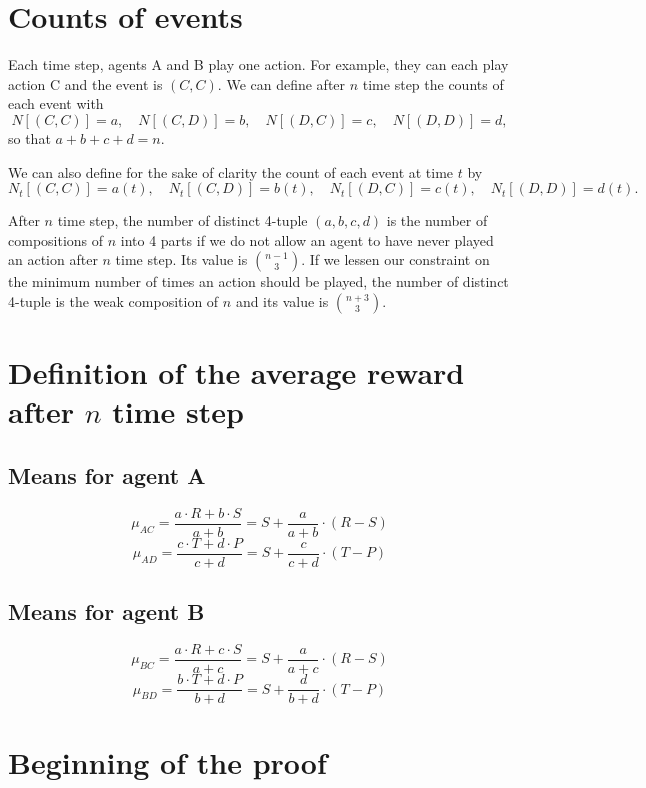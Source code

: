\documentclass{article}
\theoremstyle{definition}
\begin{document}

\section{Counts of events}

Each time step, agents A and B play one action. For example, they can each play action C and the event is \((C,C)\).  
We can define after \(n\) time step the counts of each event with 
\[
N[(C,C)] = a,\quad N[(C,D)] = b,\quad N[(D,C)] = c,\quad N[(D,D)] = d,
\]
so that \(a+b+c+d = n\).

We can also define for the sake of clarity the count of each event at time \(t\) by
\[
N_{t}[(C,C)] = a(t),\quad N_{t}[(C,D)] = b(t),\quad N_{t}[(D,C)] = c(t),\quad N_{t}[(D,D)] = d(t).
\]

After \(n\) time step, the number of distinct 4-tuple \((a,b,c,d)\) is the number of compositions of \(n\) into 4 parts if we do not allow an agent to have never played an action after \(n\) time step. Its value is \(\binom{n-1}{3}\). If we lessen our constraint on the minimum number of times an action should be played, the number of distinct 4-tuple is the weak composition of \(n\) and its value is \(\binom{n+3}{3}\). 

\section{Definition of the average reward after \(n\) time step}

\subsection{Means for agent A}

\[
\mu_{AC} = \frac{a \cdot R + b \cdot S}{a+b} = S+\frac{a}{a+b} \cdot (R-S)
\]
\[
\mu_{AD} = \frac{c \cdot T + d \cdot P}{c+d} = S+\frac{c}{c+d} \cdot (T-P)
\]

\subsection{Means for agent B}

\[
\mu_{BC} = \frac{a \cdot R + c \cdot S}{a+c} = S+\frac{a}{a+c} \cdot (R-S)
\]
\[
\mu_{BD} = \frac{b \cdot T + d \cdot P}{b+d} = S+\frac{d}{b+d} \cdot (T-P)
\]

\section{Beginning of the proof}
\end{document}
